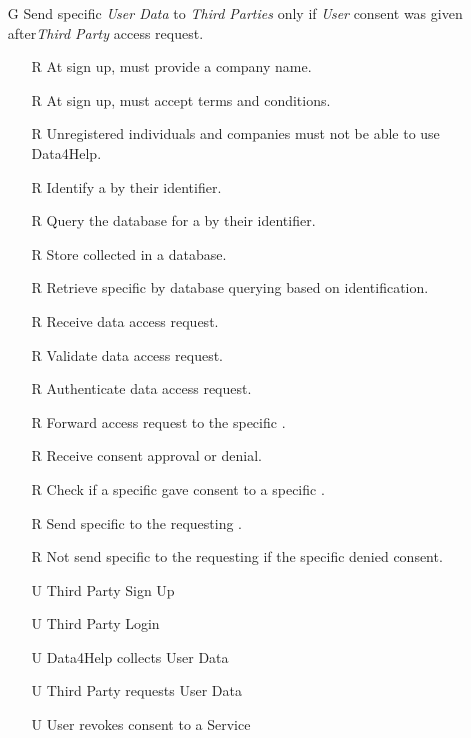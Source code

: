 \documentclass[../../../rasd.tex]{subfiles}
\begin{document}
\begin{itemize}
\begin{itemize}
    \end{itemize}

    \item[G\subs{2}]Send specific \textit{User Data} to \textit{Third Parties} only if \textit{User} consent was given after\textit{Third Party} access request.
    \begin{itemize}
            \item[R\subs{3}]At sign up,  must provide a company name.
            \item[R\subs{5}]At sign up,  must accept terms and conditions.
        \item[R\subs{1}]Unregistered individuals and companies must not be able to use Data4Help.
        \item[R\subs{6}]Identify a  by their identifier.
        \item[R\subs{7}]Query the database for a  by their identifier.
        \item[R\subs{11}]Store collected  in a database.
        \item[R\subs{12}]Retrieve specific  by database querying based on  identification.
        \item[R\subs{13}]Receive  data access request.
        \item[R\subs{14}]Validate  data access request.
        \item[R\subs{15}]Authenticate  data access request.
        \item[R\subs{16}]Forward  access request to the specific .
        \item[R\subs{17}]Receive  consent approval or denial.
        \item[R\subs{18}]Check if a specific  gave consent to a specific .
        \item[R\subs{19}]Send specific to the requesting .
        \item[R\subs{20}]Not send specific to the requesting  if the specific  denied consent.
        \\
        \item[U\subs{2}]Third Party Sign Up
        \item[U\subs{4}]Third Party Login
        \item[U\subs{5}]Data4Help collects User Data
        \item[U\subs{6}]Third Party requests User Data
        \item[U\subs{11}]User revokes consent to a Service
    \end{itemize}


\end{itemize}
\end{document}
